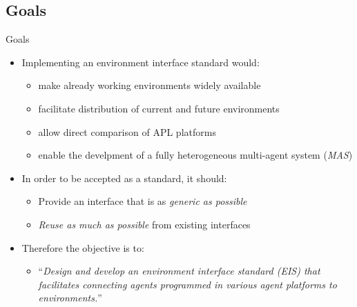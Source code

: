 \documentclass[t]{beamer}
\begin{document}
\subsection{Goals}
\begin{frame}{Goals}
	\begin{itemize}
		\item Implementing an environment interface standard would:\nolinebreak\begin{itemize}
			\item make already working environments widely available
			\item facilitate distribution of current and future environments
			\item allow direct comparison of APL platforms
			\item enable the develpment of a fully heterogeneous multi-agent system (\emph{MAS})
		\end{itemize}
		\item In order to be accepted as a standard, it should:
		\begin{itemize}
			\item Provide an interface that is as \textit{generic as possible}
			\item \textit{Reuse as much as possible} from existing interfaces
		\end{itemize}
		\item Therefore the objective is to: 
		\begin{itemize}
			\item[] ``\textit{Design and develop an environment interface standard (\emph{EIS}) that facilitates connecting agents programmed in various agent platforms to environments.}''
		\end{itemize}
	\end{itemize}
\end{frame}
\end{document}
